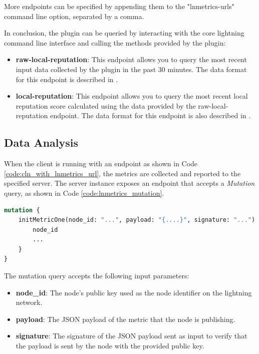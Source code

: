 More endpoints can be specified by appending them to the "lnmetrics-urls" command line option, separated by a comma.

In conclusion, the plugin can be queried by interacting with the core lightning 
command line interface and calling the methods provided by the plugin:

\begin{itemize}
    \item {\bf raw-local-reputation}: This endpoint allows you to query the most recent input data 
        collected by the plugin in the past 30 minutes. The data format for this endpoint 
        is described in \cite{lnmetrics_localreputation}.
    \item {\bf local-reputation}: This endpoint allows you to query the most recent local 
        reputation score calculated using the data provided by the raw-local-reputation 
        endpoint. The data format for this endpoint is also described in \cite{lnmetrics_localreputation}.
\end{itemize}

\subsection{Data Analysis}

When the client is running with an endpoint as shown in Code \ref{code:cln_with_lnmetrics_url}, the metrics are 
collected and reported to the specified server. The server instance exposes an endpoint that accepts a \emph{Mutation} 
query, as shown in Code \ref{code:lnmetrics_mutation}.

\begin{lstlisting}[language=graphql, basicstyle=\small,
                  caption={Mutation query call by the client to initialise the metric on the server.}, 
                  label={code:lnmetrics_mutation}]
mutation {
    initMetricOne(node_id: "...", payload: "{....}", signature: "...") {
        node_id
        ...
    }
}
\end{lstlisting}

The mutation query accepts the following input parameters:

\begin{itemize}
    \item {\bf node\_id}: The node's public key used as the node identifier on the lightning network.
    \item {\bf payload}: The JSON payload of the metric that the node is publishing.
    \item {\bf signature}: The signature of the JSON payload sent as input to verify that the
        payload is sent by the node with the provided public key.
\end{itemize}

